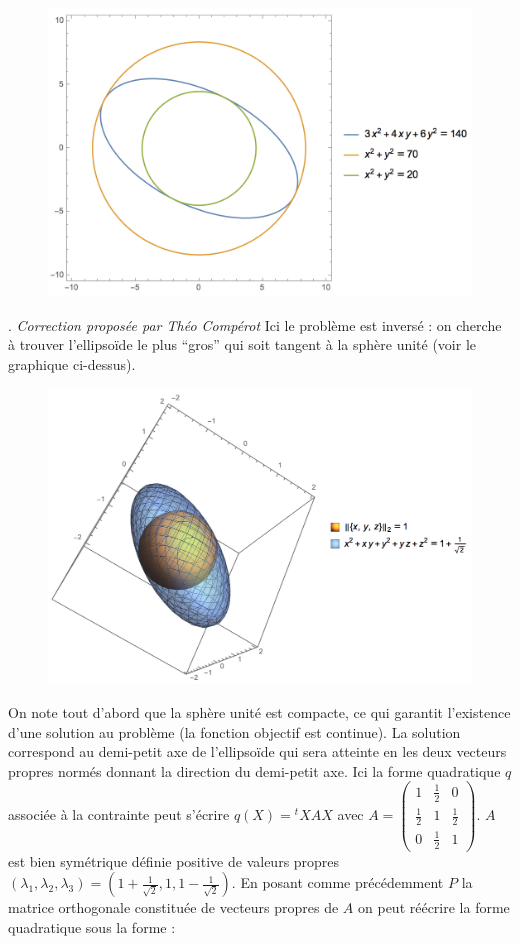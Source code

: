 \documentclass{report}
\begin{document}
\begin{figure}[h]
\includegraphics[scale=0.5]{2}
\centering 
\end{figure}
\newpage 
{}. \hfill \textit{Correction proposée par Théo Compérot}\newline
Ici le problème est inversé : on cherche à trouver l'ellipsoïde le plus ``gros'' qui soit tangent à la sphère unité (voir le graphique ci-dessus).\newline
\begin{figure}[t]
\includegraphics[scale=0.5]{3}
\centering 
\end{figure}
\noindent On note tout d'abord que la sphère unité est compacte, ce qui garantit l'existence d'une solution au problème (la fonction objectif est continue). La solution correspond au demi-petit axe de l'ellipsoïde qui sera atteinte en les deux vecteurs propres normés donnant la direction du demi-petit axe. Ici la forme quadratique $q$ associée à la contrainte peut s'écrire $q(X) = {}^t\! XAX$ avec $A =\begin{pmatrix} 1 & \frac{1}{2} & 0 \\ \frac{1}{2} & 1 & \frac{1}{2} \\ 0 & \frac{1}{2} & 1 \end{pmatrix}$. $A$ est bien symétrique définie positive de valeurs propres $(\lambda_1,\lambda_2,\lambda_3) = \left(1+ \frac{1}{\sqrt{2}}, 1 , 1-\frac{1}{\sqrt{2}} \right)$. En posant comme précédemment $P$ la matrice orthogonale constituée de vecteurs propres de $A$ on peut réécrire la forme quadratique sous la forme :
\end{document}
